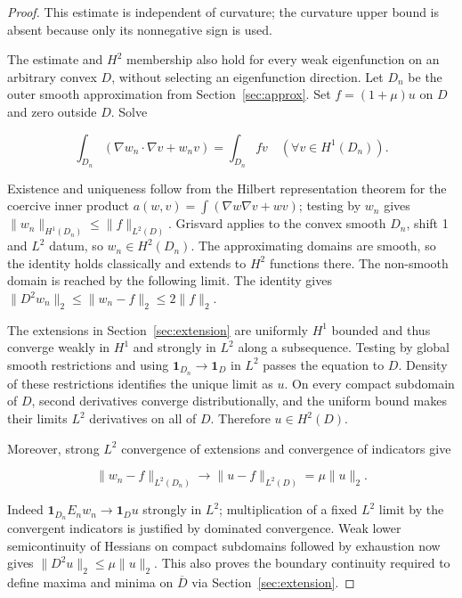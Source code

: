 \documentclass[11pt]{article}
\theoremstyle{definition}
\theoremstyle{remark}
\numberwithin{equation}{section}
\begin{document}
\begin{proof}
This estimate is independent of curvature; the curvature upper bound is absent because only its nonnegative sign is used.

The estimate and $H^2$ membership also hold for every weak eigenfunction on an arbitrary convex $D$, without selecting an eigenfunction direction. Let $D_n$ be the outer smooth approximation from Section~\ref{sec:approx}. Set $f=(1+\mu)u$ on $D$ and zero outside $D$. Solve

\begin{equation}\label{eq:src-3-05}
\int_{D_n}(\nabla w_n\cdot\nabla v+w_nv)=\int_{D_n}fv\quad(\forall v\in H^1(D_n)).
\end{equation}

Existence and uniqueness follow from the Hilbert representation theorem for the coercive inner product $a(w,v)=\int(\nabla w\nabla v+wv)$; testing by $w_n$ gives $\|w_n\|_{H^1(D_n)}\le\|f\|_{L^2(D)}$. Grisvard \cite[Theorem~3.2.1.3]{Grisvard} applies to the convex smooth $D_n$, shift 1 and $L^2$ datum, so $w_n\in H^2(D_n)$. The approximating domains are smooth, so the identity holds classically and extends to $H^2$ functions there. The non-smooth domain is reached by the following limit. The identity gives $\|D^2w_n\|_2\le\|w_n-f\|_2\le2\|f\|_2$.

The extensions in Section~\ref{sec:extension} are uniformly $H^1$ bounded and thus converge weakly in $H^1$ and strongly in $L^2$ along a subsequence. Testing by global smooth restrictions and using $\mathbf1_{D_n}\to\mathbf1_D$ in $L^2$ passes the equation to $D$. Density of these restrictions identifies the unique limit as $u$. On every compact subdomain of $D$, second derivatives converge distributionally, and the uniform bound makes their limits $L^2$ derivatives on all of $D$. Therefore $u\in H^2(D)$.

Moreover, strong $L^2$ convergence of extensions and convergence of indicators give

\begin{equation}\label{eq:src-3-06}
\|w_n-f\|_{L^2(D_n)}\longrightarrow\|u-f\|_{L^2(D)}=\mu\|u\|_2.
\end{equation}

Indeed $\mathbf1_{D_n}E_nw_n\to\mathbf1_Du$ strongly in $L^2$; multiplication of a fixed $L^2$ limit by the convergent indicators is justified by dominated convergence. Weak lower semicontinuity of Hessians on compact subdomains followed by exhaustion now gives $\|D^2u\|_2\le\mu\|u\|_2$. This also proves the boundary continuity required to define maxima and minima on $\overline D$ via Section~\ref{sec:extension}.
\end{proof}
\end{document}
